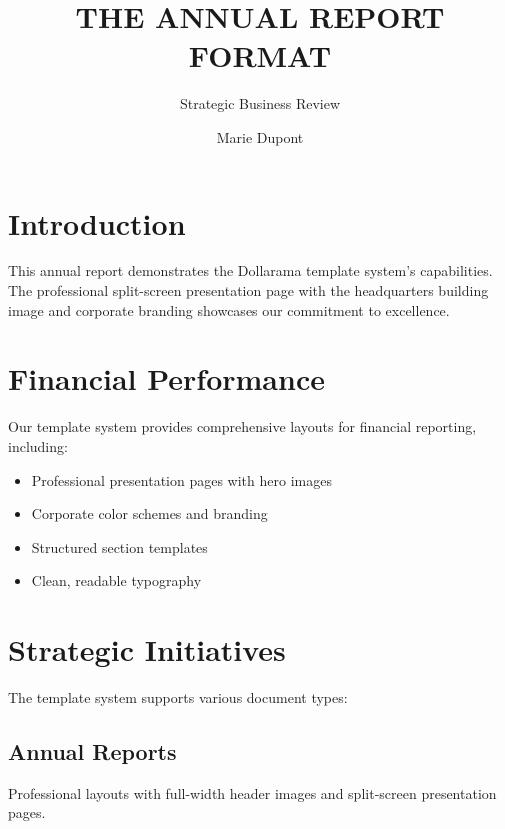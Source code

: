 \documentclass{dollarama}
\title{THE ANNUAL REPORT FORMAT}
\subtitle{Strategic Business Review}
\author{Marie Dupont}
\begin{document}
\maketitle


\tableofcontents
\clearpage


\section{Introduction}

This annual report demonstrates the Dollarama template system's capabilities. The professional split-screen presentation page with the headquarters building image and corporate branding showcases our commitment to excellence.

\section{Financial Performance}

Our template system provides comprehensive layouts for financial reporting, including:

\begin{itemize}
    \item Professional presentation pages with hero images
    \item Corporate color schemes and branding
    \item Structured section templates
    \item Clean, readable typography
\end{itemize}

\section{Strategic Initiatives}

The template system supports various document types:

\subsection{Annual Reports}
Professional layouts with full-width header images and split-screen presentation pages.
\end{document}

